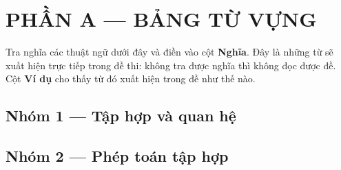 \documentclass[11pt, a4paper]{article}
\begin{document}

\section{PHẦN A — BẢNG TỪ VỰNG}

Tra nghĩa các thuật ngữ dưới đây và điền vào cột \textbf{Nghĩa}. Đây là những từ sẽ xuất hiện trực tiếp trong đề thi: không tra được nghĩa thì không đọc được đề. Cột \textbf{Ví dụ} cho thấy từ đó xuất hiện trong đề như thế nào.

\subsection{Nhóm 1 — Tập hợp và quan hệ}


\subsection{Nhóm 2 — Phép toán tập hợp}
\end{document}
